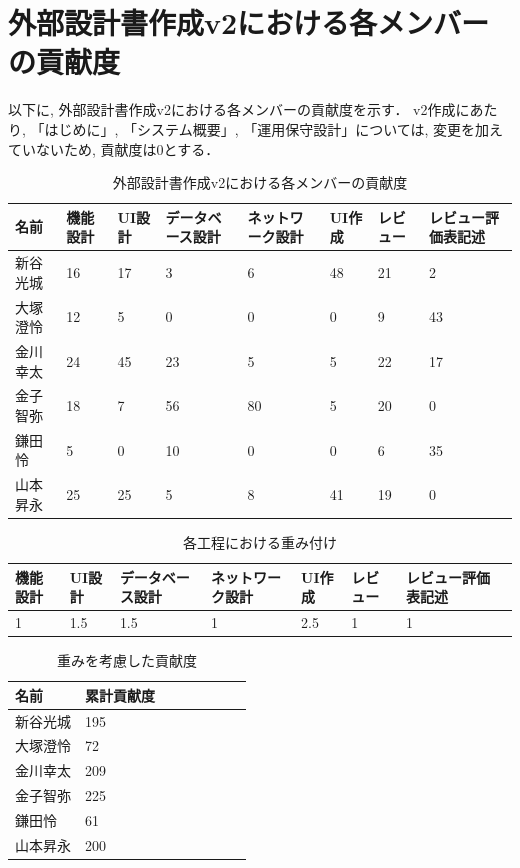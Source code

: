 \documentclass[a4paper,dvipdfmx]{jarticle}
\begin{document}
\section*{外部設計書作成v2における各メンバーの貢献度}
以下に, 外部設計書作成v2における各メンバーの貢献度を示す．
v2作成にあたり, 「はじめに」, 「システム概要」, 「運用保守設計」については,
変更を加えていないため, 貢献度は0とする．

\begin{table}[H]
  \centering
  \caption{外部設計書作成v2における各メンバーの貢献度}
  \label{tab:cont}
  \begin{tabular}{|l|l|l|l|l|l|l|l|}
    \hline
    名前   & 機能設計 & UI設計 & データベース設計 & ネットワーク設計 & UI作成 & レビュー & レビュー評価表記述 \\ \hline
    新谷光城 & 16   & 17   & 3        & 6        & 48   & 21   & 2         \\ \hline
    大塚澄怜 & 12   & 5    & 0        & 0        & 0    & 9    & 43        \\ \hline
    金川幸太 & 24   & 45   & 23       & 5        & 5    & 22   & 17        \\ \hline
    金子智弥 & 18   & 7    & 56       & 80       & 5    & 20   & 0         \\ \hline
    鎌田怜  & 5    & 0    & 10       & 0        & 0    & 6    & 35        \\ \hline
    山本昇永 & 25   & 25   & 5        & 8        & 41   & 19   & 0         \\ \hline
  \end{tabular}
\end{table}
\begin{table}[H]
  \centering
  \caption{各工程における重み付け}
  \label{tab:weight}
  \begin{tabular}{|l|l|l|l|l|l|l|l|}
    \hline
    機能設計 & UI設計 & データベース設計 & ネットワーク設計 & UI作成 & レビュー & レビュー評価表記述 \\ \hline
    1    & 1.5  & 1.5      & 1        & 2.5  & 1    & 1         \\ \hline
  \end{tabular}
\end{table}

\begin{table}[H]
  \centering
  \caption{重みを考慮した貢献度}
  \label{tab:cont2}
  \begin{tabular}{|l|l|l|l|l|l|l|l|}
    \hline
    名前   & 累計貢献度 \\ \hline
    新谷光城 & 195   \\ \hline
    大塚澄怜 & 72    \\ \hline
    金川幸太 & 209   \\ \hline
    金子智弥 & 225   \\ \hline
    鎌田怜  & 61    \\ \hline
    山本昇永 & 200   \\ \hline
  \end{tabular}
\end{table}
\end{document}
